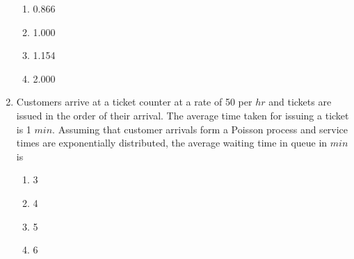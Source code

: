 \documentclass[journal]{IEEEtran}
\begin{document}
\begin{enumerate}
  \begin{enumerate}
   \item 0.866
   \item 1.000
   \item 1.154
   \item 2.000 \\
\end{enumerate}
\item Customers arrive at a ticket counter at a rate of 50 per $hr$ and tickets are issued in the order of their arrival. The average time taken for issuing a ticket is 1 $min$. Assuming that customer arrivals form a Poisson process and service times are exponentially distributed, the average waiting time in queue in $min$ is
\begin{enumerate}
    \item 3
    \item 4
    \item 5
    \item 6 \\
\end{enumerate}
			 \end{enumerate}
			 
\end{document}
